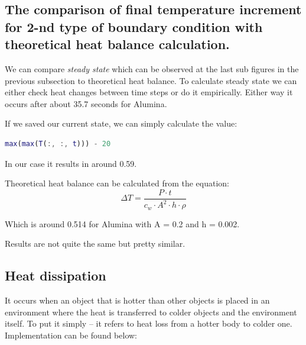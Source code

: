 \documentclass[12pt]{article}
\begin{document}
\subsection{The comparison of final temperature increment for 2-nd type of boundary condition with theoretical heat balance calculation.}

We can compare \textit{steady state} which can be observed at the last sub figures in the previous subsection to theoretical heat balance. To calculate steady state we can either check heat changes between time steps or do it empirically. Either way it occurs after about 35.7 seconds for Alumina.

If we saved our current state, we can simply calculate the value:

\begin{lstlisting}[language=Matlab, caption = {Heat balance for simulation}, frame=single]
% we take maximum from T and subtract starting temperature
max(max(T(:, :, t))) - 20
\end{lstlisting}
In our case it results in around 0.59.

Theoretical heat balance can be calculated from the equation:
\begin{equation}
\Delta T = \frac{P \cdot t}{c_w \cdot A^2 \cdot h \cdot \rho}
\end{equation}

Which is around 0.514 for Alumina with A = 0.2 and h = 0.002.

Results are not quite the same but pretty similar.

\subsection{Heat dissipation}
It occurs when an object that is hotter than other objects is placed in an environment where the heat is transferred to colder objects and the environment itself. To put it simply -- it refers to heat loss from a hotter body to colder one. Implementation can be found below:


\end{document}
